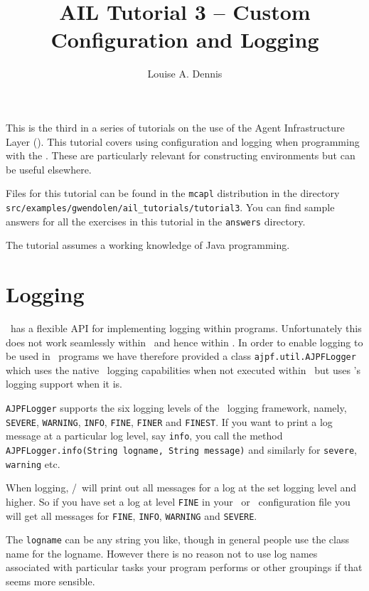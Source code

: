 \documentclass[a4]{article}
\author{Louise A. Dennis}
\title{AIL Tutorial 3 -- Custom Configuration and Logging}
\begin{document}
\maketitle
This is the third in a series of tutorials on the use of the Agent Infrastructure Layer (\ail).  This tutorial covers using configuration and logging when programming with the \ail.  These are particularly relevant for constructing environments but can be useful elsewhere.

Files for this tutorial can be found in the \texttt{mcapl} distribution in the directory \texttt{src/examples/gwendolen/ail\_tutorials/tutorial3}.  You can find sample answers for all the exercises in this tutorial in the \texttt{answers} directory.

The tutorial assumes a working knowledge of Java programming.

\section{Logging}
\java\ has a flexible API for implementing logging within programs.  Unfortunately this does not work seamlessly within \jpf\ and hence within \ajpf.  In order to enable logging to be used in \ail\ programs we have therefore provided a class \texttt{ajpf.util.AJPFLogger} which uses the native \java\ logging capabilities when not executed within \ajpf\ but uses \jpf's logging support when it is.

\begin{sloppypar}
\texttt{AJPFLogger} supports the six logging levels of the \java\ logging framework, namely, \texttt{SEVERE}, \texttt{WARNING}, \texttt{INFO}, \texttt{FINE}, \texttt{FINER} and \texttt{FINEST}.  If you want to print a log message at a particular log level, say \texttt{info}, you call the method \texttt{AJPFLogger.info(String logname, String message)} and similarly for \texttt{severe}, \texttt{warning} etc.
\end{sloppypar}

When logging, \java/\jpf\ will print out all messages for a log at the set logging level and higher.  So if you have set a log at level \texttt{FINE} in your \ail\ or \jpf\ configuration file you will get all messages for \texttt{FINE}, \texttt{INFO}, \texttt{WARNING} and \texttt{SEVERE}.

The \texttt{logname} can be any string you like, though in general people use the class name for the logname.  However there is no reason not to use log names associated with particular tasks your program performs or other groupings if that seems more sensible.
\end{document}
